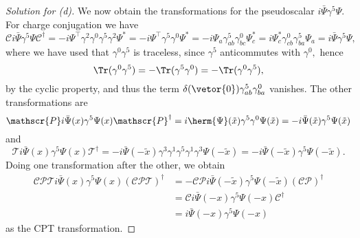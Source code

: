 \begin{proof}[Solution for (d)]
   We now obtain the transformations for the pseudoscalar \(i \bar{\Psi}\gamma^5 \Psi.\) For charge conjugation we have
   \begin{equation*}
      \mathscr{C} i \bar{\Psi} \gamma^5 \Psi \mathscr{C}^\dag = -i\Psi^\top \gamma^2 \gamma^0 \gamma^5 \gamma^2 \Psi^* = -i \Psi^\top \gamma^5 \gamma^0 \Psi^* = -i \Psi_a \gamma^5_{ab} \gamma^0_{bc} \Psi^*_c = i \Psi^*_c \gamma^0_{cb}\gamma^5_{ba} \Psi_a = i \bar{\Psi} \gamma^5 \Psi,
   \end{equation*}
   where we have used that \(\gamma^0 \gamma^5\) is traceless, since \(\gamma^5\) anticommutes with \(\gamma^0,\) hence 
   \begin{equation*}
      \Tr(\gamma^0 \gamma^5) = - \Tr(\gamma^5 \gamma^0) = -\Tr(\gamma^0 \gamma^5),
   \end{equation*}
   by the cyclic property, and thus the term \(\delta(\vetor{0}) \gamma^5_{ab} \gamma^0_{ba}\) vanishes. The other transformations are
   \begin{equation*}
      \mathscr{P} i \bar{\Psi}(x) \gamma^5 \Psi(x) \mathscr{P}^\dag = i \herm{\Psi}(\tilde{x}) \gamma^5 \gamma^0 \Psi(\tilde{x}) = -i \bar{\Psi}(\tilde{x}) \gamma^5 \Psi(\tilde{x})
   \end{equation*}
   and
   \begin{equation*}
      \mathscr{T} i \bar{\Psi}(x) \gamma^5 \Psi(x) \mathscr{T}^\dag = -i \bar{\Psi}(-\tilde{x})\gamma^3 \gamma^1 \gamma^5 \gamma^1 \gamma^3\Psi(-\tilde{x}) = -i \bar{\Psi}(-\tilde{x}) \gamma^5 \Psi(-\tilde{x}).
   \end{equation*}
   Doing one transformation after the other, we obtain
   \begin{align*}
      \mathscr{CPT} i\bar{\Psi}(x)\gamma^5\Psi(x) (\mathscr{CPT})^\dag 
       &= -\mathscr{CP} i\bar{\Psi}(-\tilde{x}) \gamma^5\Psi(-\tilde{x}) (\mathscr{CP})^{\dag}\\
       &= \mathscr{C}i\bar{\Psi}(-x)\gamma^5 \Psi(-x) \mathscr{C}^\dag\\
       &= i\bar{\Psi}(-x) \gamma^5\Psi(-x)
   \end{align*}
   as the CPT transformation.
\end{proof}
